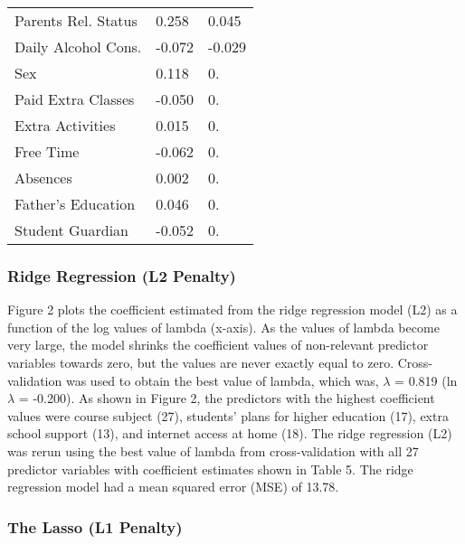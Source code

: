 \documentclass[sigconf]{acmart}
\begin{document}
\begin{table}
\begin{tabular}{lll}
    Parents Rel. Status &    0.258      &    0.045   \\   
    Daily Alcohol Cons. &   -0.072      &   -0.029   \\ 
    Sex                 &    0.118      &    0.   \\
    Paid Extra Classes  &   -0.050      &    0.   \\      
    Extra Activities    &    0.015      &    0.   \\    
    Free Time           &   -0.062      &    0.   \\    
    Absences            &    0.002      &    0.   \\
    Father's Education  &    0.046      &    0.   \\         
    Student Guardian    &   -0.052      &    0.   \\    

    \bottomrule
  \end{tabular}
\end{table}


\subsubsection{Ridge Regression (L2 Penalty)}

Figure 2 plots the coefficient estimated from the ridge regression model (L2) 
as a function of the log values of lambda (x-axis). As the values of lambda 
become very large, the model shrinks the coefficient values of non-relevant 
predictor variables towards zero, but the values are never exactly equal to 
zero. Cross-validation was used to obtain the best value of lambda, which 
was, $\lambda$ = 0.819 (ln$\lambda$  = -0.200). As shown in Figure 2, the 
predictors with the highest coefficient values were course subject (27), 
students' plans for higher education (17), extra school support (13), and 
internet access at home (18). The ridge regression (L2) was rerun using the
best value of lambda from cross-validation with all 27 predictor variables 
with coefficient estimates shown in Table 5. The ridge regression model had 
a mean squared error (MSE) of 13.78. 


\subsubsection{The Lasso (L1 Penalty)}
\end{document}
